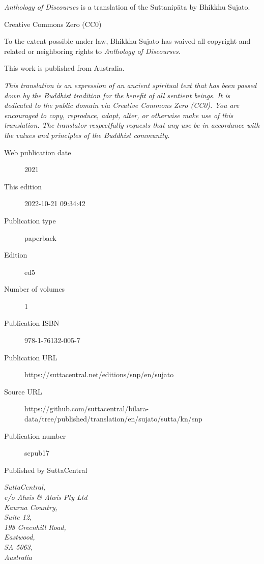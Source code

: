 \documentclass[12pt,openany]{book}%
\begin{document}
\begin{footnotesize}

\textit{Anthology of Discourses} is a translation of the Suttanipāta by Bhikkhu Sujato.

\medskip

Creative Commons Zero (CC0)

To the extent possible under law, Bhikkhu Sujato has waived all copyright and related or neighboring rights to \textit{Anthology of Discourses}.

\medskip

This work is published from Australia.

\begin{center}
\textit{This translation is an expression of an ancient spiritual text that has been passed down by the Buddhist tradition for the benefit of all sentient beings. It is dedicated to the public domain via Creative Commons Zero (CC0). You are encouraged to copy, reproduce, adapt, alter, or otherwise make use of this translation. The translator respectfully requests that any use be in accordance with the values and principles of the Buddhist community.}
\end{center}

\medskip

\begin{description}
    \item[Web publication date] 2021
    \item[This edition] 2022-10-21 09:34:42
    \item[Publication type] paperback
    \item[Edition] ed5
    \item[Number of volumes] 1
    \item[Publication ISBN] 978-1-76132-005-7
    \item[Publication URL] https://suttacentral.net/editions/snp/en/sujato
    \item[Source URL] https://github.com/suttacentral/bilara-data/tree/published/translation/en/sujato/sutta/kn/snp
    \item[Publication number] scpub17
\end{description}

\medskip

Published by SuttaCentral

\medskip

\textit{SuttaCentral,\\
c/o Alwis \& Alwis Pty Ltd\\
Kaurna Country,\\
Suite 12,\\
198 Greenhill Road,\\
Eastwood,\\
SA 5063,\\
Australia}

\end{footnotesize}
\end{document}
